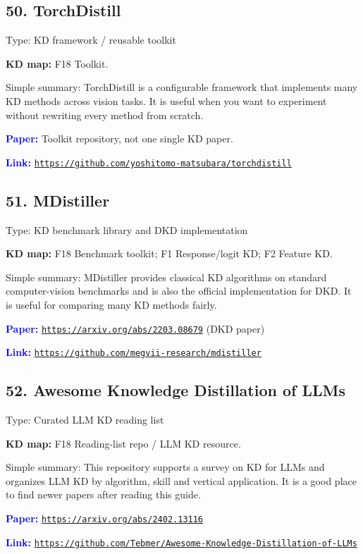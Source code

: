 \documentclass[10pt]{article}
\begin{document}
\subsection*{50. TorchDistill}
Type: KD framework / reusable toolkit\par
\textbf{KD map:} F18 Toolkit.\par
Simple summary: TorchDistill is a configurable framework that implements many KD methods across vision tasks. It is useful when you want to experiment without rewriting every method from scratch.\par
\textcolor{blue}{\textbf{Paper:}} Toolkit repository, not one single KD paper.\par
\textcolor{blue}{\textbf{Link:}} \href{https://github.com/yoshitomo-matsubara/torchdistill}{\nolinkurl{https://github.com/yoshitomo-matsubara/torchdistill}}\par

\subsection*{51. MDistiller}
Type: KD benchmark library and DKD implementation\par
\textbf{KD map:} F18 Benchmark toolkit; F1 Response/logit KD; F2 Feature KD.\par
Simple summary: MDistiller provides classical KD algorithms on standard computer-vision benchmarks and is also the official implementation for DKD. It is useful for comparing many KD methods fairly.\par
\textcolor{blue}{\textbf{Paper:}} \href{https://arxiv.org/abs/2203.08679}{\nolinkurl{https://arxiv.org/abs/2203.08679}} (DKD paper)\par
\textcolor{blue}{\textbf{Link:}} \href{https://github.com/megvii-research/mdistiller}{\nolinkurl{https://github.com/megvii-research/mdistiller}}\par

\subsection*{52. Awesome Knowledge Distillation of LLMs}
Type: Curated LLM KD reading list\par
\textbf{KD map:} F18 Reading-list repo / LLM KD resource.\par
Simple summary: This repository supports a survey on KD for LLMs and organizes LLM KD by algorithm, skill and vertical application. It is a good place to find newer papers after reading this guide.\par
\textcolor{blue}{\textbf{Paper:}} \href{https://arxiv.org/abs/2402.13116}{\nolinkurl{https://arxiv.org/abs/2402.13116}}\par
\textcolor{blue}{\textbf{Link:}} \href{https://github.com/Tebmer/Awesome-Knowledge-Distillation-of-LLMs}{\nolinkurl{https://github.com/Tebmer/Awesome-Knowledge-Distillation-of-LLMs}}\par
\end{document}
